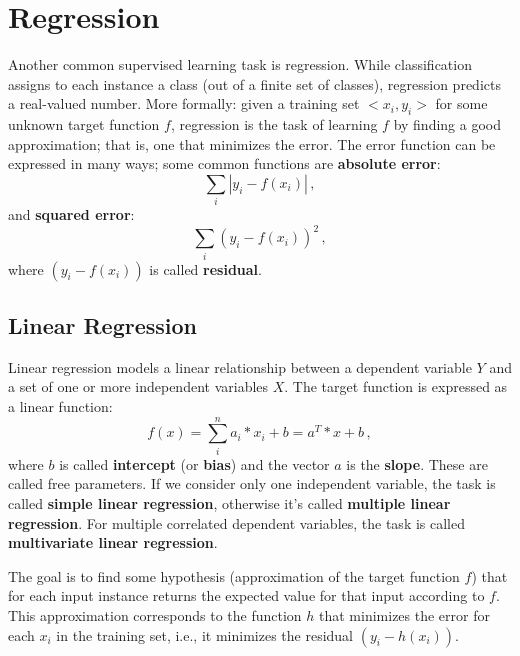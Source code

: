 \chapter{Regression}

Another common supervised learning task is regression. While classification assigns to each instance a class (out of a finite set of classes), regression predicts a real-valued number. More formally: given a training set $<x_i, y_i>$ for some unknown target function $f$, regression is the task of learning $f$ by finding a good approximation; that is, one that minimizes the error. The error function can be expressed in many ways; some common functions are \textbf{absolute error}:
\begin{equation*}
    \sum_i |y_i - f(x_i)| \,,
\end{equation*}
and \textbf{squared error}:
\begin{equation*}
    \sum_i (y_i - f(x_i))^2 \,,
\end{equation*}
where $(y_i - f(x_i))$ is called \textbf{residual}.

\section{Linear Regression}

Linear regression models a linear relationship between a dependent variable $Y$ and a set of one or more independent variables $X$. The target function is expressed as a linear function:
\begin{equation*}
    f(x) = \sum_i^n a_i*x_i + b = a^T*x + b\,,
\end{equation*}
where $b$ is called \textbf{intercept} (or \textbf{bias}) and the vector $a$ is the \textbf{slope}. These are called free parameters. If we consider only one independent variable, the task is called \textbf{simple linear regression}, otherwise it's called \textbf{multiple linear regression}. For multiple correlated dependent variables, the task is called \textbf{multivariate linear regression}.

The goal is to find some hypothesis (approximation of the target function $f$) that for each input instance returns the expected value for that input according to $f$. This approximation corresponds to the function $h$ that minimizes the error for each $x_i$ in the training set, i.e., it minimizes the residual $(y_i - h(x_i))$.

